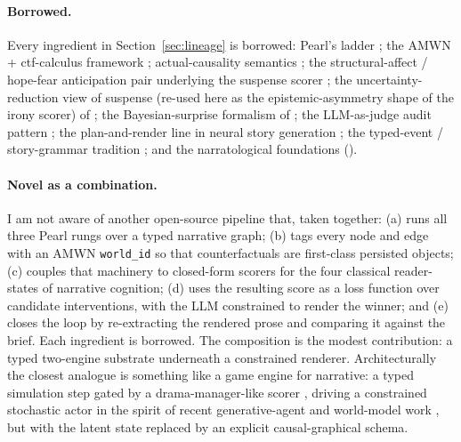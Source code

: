 \documentclass[11pt]{article}
\begin{document}
\paragraph{Borrowed.} Every ingredient in
Section~\ref{sec:lineage} is borrowed: Pearl's ladder
\citep{pearl2009causality,bareinboim2022pearl}; the AMWN +
ctf-calculus framework \citep{correa2025amwn}; actual-causality
semantics \citep{halpern2016actual}; the structural-affect /
hope-fear anticipation pair underlying the suspense scorer
\citep{brewer1982stories,comisky1982suspense,ortony1988occ,
zillmann1996suspense,cheong2015suspenser}; the
uncertainty-reduction view of suspense (re-used here as the
epistemic-asymmetry shape of the irony scorer) of
\citet{wilmot2020suspense}; the Bayesian-surprise formalism of
\citet{ittibaldi2009surprise}; the LLM-as-judge audit pattern
\citep{bai2022constitutional,madaan2023selfrefine,gu2024judge};
the plan-and-render line in neural story generation
\citep{riedlyoung2010narrative,yao2019planwrite,
goldfarbtarrant2020aristotelian,yang2023doc,yang2022re3,
rashkin2020plotmachines}; the typed-event / story-grammar tradition
\citep{schank1977scripts,lehnert1981plotunits,mani2012computational,
elson2012sig}; and the narratological foundations
(\citealp{shklovsky1965art,genette1980narrative,sternberg1992telling,
ryan1991possible,herman2002story,zwaan1998situation}).

\paragraph{Novel as a combination.} I am not aware of another
open-source pipeline that, taken together: (a) runs all three
Pearl rungs over a typed narrative graph; (b) tags every node
and edge with an AMWN \texttt{world\_id}
\citep{correa2025amwn} so that counterfactuals are first-class
persisted objects; (c) couples that machinery to closed-form
scorers for the four classical reader-states of narrative
cognition; (d) uses the resulting score as a loss function over
candidate interventions, with the LLM constrained to render the
winner; and (e) closes the loop by re-extracting the rendered
prose and comparing it against the brief. Each ingredient is
borrowed. The composition is the modest contribution: a typed
two-engine substrate underneath a constrained renderer.
Architecturally the closest analogue is something like a game
engine for narrative: a typed simulation step gated by a
drama-manager-like scorer
\citep{mateas2003facade,riedl2013interactive,ware2014glaive},
driving a constrained stochastic actor in the spirit of recent
generative-agent and world-model work
\citep{park2023generative,ha2018world,hao2023rap}, but with the
latent state replaced by an explicit causal-graphical schema.
\end{document}
